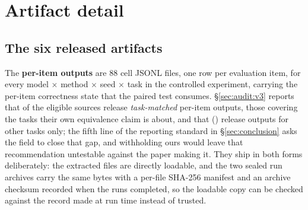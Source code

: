 %
%

\section{Artifact detail}
\label{app:artifacts-detail}

\subsection{The six released artifacts}
\label{app:artifacts:released}

The \textbf{per-item outputs} are 88 cell JSONL files, one row per evaluation
item, for every model $\times$ method $\times$ seed $\times$ task in the
controlled experiment, carrying the per-item correctness state that the paired
test consumes. \S\ref{sec:audit:v3} reports that \AuditPerItemTaskMatched{} of
the \AuditEligible{} eligible sources release \emph{task-matched} per-item
outputs, those covering the tasks their own equivalence claim is about, and that
\AuditPerItemOtherTaskOnly{} (\AuditPerItemOtherTaskClaims{}) release outputs for
other tasks only; the fifth line of the reporting standard in
\S\ref{sec:conclusion} asks the field to close that gap, and withholding ours
would leave that recommendation untestable against the paper making it. They
ship in both forms deliberately: the extracted files are directly loadable, and
the two sealed run archives carry the same bytes with a per-file SHA-256
manifest and an archive checksum recorded when the runs completed, so the
loadable copy can be checked against the record made at run time instead of
trusted.

